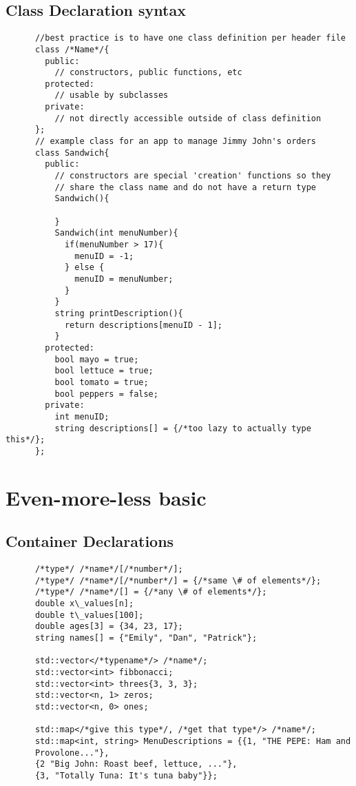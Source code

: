 \documentclass[12pt]{article}
\begin{document}
  \subsection{Class Declaration syntax}
    \begin{lstlisting}
      //best practice is to have one class definition per header file
      class /*Name*/{
        public:
          // constructors, public functions, etc
        protected:
          // usable by subclasses
        private:
          // not directly accessible outside of class definition
      };
      // example class for an app to manage Jimmy John's orders
      class Sandwich{
        public:
          // constructors are special 'creation' functions so they
          // share the class name and do not have a return type
          Sandwich(){
          
          }
          Sandwich(int menuNumber){
            if(menuNumber > 17){
              menuID = -1;
            } else {
              menuID = menuNumber;
            }
          }
          string printDescription(){
            return descriptions[menuID - 1];
          }
        protected:
          bool mayo = true;
          bool lettuce = true;
          bool tomato = true;
          bool peppers = false;
        private:
          int menuID;
          string descriptions[] = {/*too lazy to actually type this*/};
      };
    \end{lstlisting}
\section{Even-more-less basic}
  \subsection{Container Declarations}
    \begin{lstlisting}
      /*type*/ /*name*/[/*number*/];
      /*type*/ /*name*/[/*number*/] = {/*same \# of elements*/};
      /*type*/ /*name*/[] = {/*any \# of elements*/};
      double x\_values[n];
      double t\_values[100];
      double ages[3] = {34, 23, 17};
      string names[] = {"Emily", "Dan", "Patrick"};

      std::vector</*typename*/> /*name*/;
      std::vector<int> fibbonacci;
      std::vector<int> threes{3, 3, 3};
      std::vector<n, 1> zeros;
      std::vector<n, 0> ones;

      std::map</*give this type*/, /*get that type*/> /*name*/;
      std::map<int, string> MenuDescriptions = {{1, "THE PEPE: Ham and
      Provolone..."}, 
      {2 "Big John: Roast beef, lettuce, ..."}, 
      {3, "Totally Tuna: It's tuna baby"}};
    \end{lstlisting}
\end{document}

